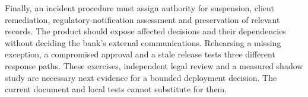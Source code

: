 Finally, an incident procedure must assign authority for suspension, client
remediation, regulatory-notification assessment and preservation of relevant
records. The product should expose affected decisions and their dependencies
without deciding the bank's external communications. Rehearsing a missing
exception, a compromised approval and a stale release tests three different
response paths. These exercises, independent legal review and a measured shadow
study are necessary next evidence for a bounded deployment decision. The current
document and local tests cannot substitute for them.

